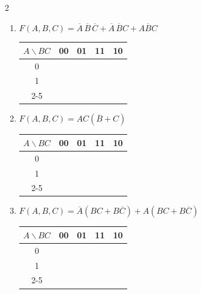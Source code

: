 \documentclass[12pt,a4paper]{article}
\begin{document}
\begin{multicols}{2}
\begin{enumerate}[label=\alph*)]
  \item \begin{minipage}[t]{\linewidth}
    $F(A,B,C) = \overline{A}\,\overline{B}\,\overline{C} + \overline{A}\,\overline{B}C + A\overline{B}C$

    \begin{center}
      \begin{tabular}{c|c|c|c|c|}
        $A \backslash BC$ & 00 & 01 & 11 & \multicolumn{1}{c}{10} \\
        \hline
        0 & \phantom{0} & \phantom{0} & \phantom{0} & \phantom{0} \\
        \hline
        1 & \phantom{0} & \phantom{0} & \phantom{0} & \phantom{0} \\
        \cline{2-5}
      \end{tabular}
    \end{center}
  \end{minipage}

  \item \begin{minipage}[t]{\linewidth}
    $F(A,B,C) = AC(\overline{B} + C)$

    \begin{center}
      \begin{tabular}{c|c|c|c|c|}
        $A \backslash BC$ & 00 & 01 & 11 & \multicolumn{1}{c}{10} \\
        \hline
        0 & \phantom{0} & \phantom{0} & \phantom{0} & \phantom{0} \\
        \hline
        1 & \phantom{0} & \phantom{0} & \phantom{0} & \phantom{0} \\
        \cline{2-5}
      \end{tabular}
    \end{center}
  \end{minipage}

  \item \begin{minipage}[t]{\linewidth}
    {\small $F(A,B,C) = \overline{A}(BC + B\overline{C}) + A(BC + B\overline{C})$}

    \begin{center}
      \begin{tabular}{c|c|c|c|c|}
        $A \backslash BC$ & 00 & 01 & 11 & \multicolumn{1}{c}{10} \\
        \hline
        0 & \phantom{0} & \phantom{0} & \phantom{0} & \phantom{0} \\
        \hline
        1 & \phantom{0} & \phantom{0} & \phantom{0} & \phantom{0} \\
        \cline{2-5}
      \end{tabular}
    \end{center}
  \end{minipage}


\end{enumerate}
\end{multicols}
\end{document}
